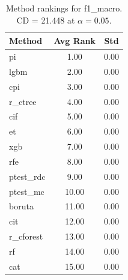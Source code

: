 \begin{table}[h]
\centering
\caption{Method rankings for f1_macro. CD = 21.448 at $\alpha=0.05$.}
\label{tab:ranks_f1_macro}
\begin{tabular}{lcc}
\toprule
Method & Avg Rank & Std \\
\midrule
pi & 1.00 & 0.00 \\
lgbm & 2.00 & 0.00 \\
cpi & 3.00 & 0.00 \\
r_ctree & 4.00 & 0.00 \\
cif & 5.00 & 0.00 \\
et & 6.00 & 0.00 \\
xgb & 7.00 & 0.00 \\
rfe & 8.00 & 0.00 \\
ptest_rdc & 9.00 & 0.00 \\
ptest_mc & 10.00 & 0.00 \\
boruta & 11.00 & 0.00 \\
cit & 12.00 & 0.00 \\
r_cforest & 13.00 & 0.00 \\
rf & 14.00 & 0.00 \\
cat & 15.00 & 0.00 \\
\bottomrule
\end{tabular}
\end{table}